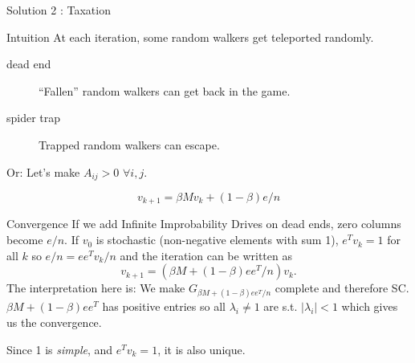 \documentclass[10pt]{beamer}
\begin{document}
\begin{frame}[allowframebreaks]{Solution 2 : Taxation}
  \begin{block}{Intuition}
    At each iteration, some random walkers get teleported randomly.
    \begin{description}
      \item[dead end] ``Fallen'' random walkers can get back in the game.
      \item[spider trap] Trapped random walkers can escape.
    \end{description}

    Or: Let's make $A_{ij} > 0$ $\forall i,j$. %
  \end{block}
  $$v_{k+1} = \beta M v_k + (1 - \beta) e/n$$
  \begin{block}{Convergence}
    If we add Infinite Improbability Drives on dead ends,
    zero columns become $e/n$.
    If $v_0$ is stochastic (non-negative elements with sum 1),
    $e^T v_k = 1$ for all $k$
    so $e/n = ee^Tv_k/n$ and the iteration can be written as
    $$v_{k+1} = (\beta M + (1 - \beta) ee^T/n) v_k.$$
    The interpretation here is: We make $G_{\beta M + (1 - \beta) ee^T/n}$ complete and therefore SC.
    $\beta M + (1-\beta) ee^T$ has positive entries so all $\lambda_i \neq 1$ are s.t. $|\lambda_i| < 1$
    which gives us the convergence.

    Since 1 is \emph{simple}, and $e^T v_k = 1$, it is also unique.
  \end{block}

\end{frame}
\end{document}

